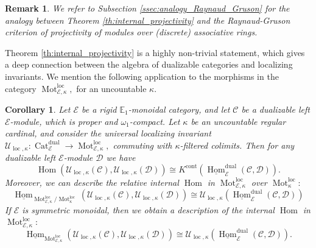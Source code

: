 \documentclass[11pt,leqno]{amsart}
\newtheorem{cor}[theo]{Corollary}
\newtheorem{remark}[theo]{Remark}
\numberwithin{equation}{section}
\def\Hom{\operatorname{Hom}}
\newcommand{\tens}[1]{%
  \mathbin{\mathop{\otimes}\displaylimits_{#1}}%
}
\newcommand{\Mot}{\operatorname{Mot}}
\newcommand{\Cat}{\operatorname{Cat}}
\newcommand{\loc}{\operatorname{loc}}
\newcommand{\cont}{\operatorname{cont}}
\newcommand{\dual}{\operatorname{dual}}
\newcommand{\bE}{{\mathbb E}}
\newcommand{\cD}{{\mathcal D}}
\newcommand{\cC}{{\mathcal C}}
\newcommand{\cE}{{\mathcal E}}
\newcommand{\cU}{{\mathcal U}}
\newcommand{\un}{\underline}
\begin{document}
\begin{remark}We refer to Subsection \ref{ssec:analogy_Raynaud_Gruson} for the analogy between Theorem \ref{th:internal_projectivity} and the Raynaud-Gruson criterion of projectivity of modules over (discrete) associative rings. 
\end{remark}

Theorem \ref{th:internal_projectivity} is a highly non-trivial statement, which gives a deep connection between the algebra of dualizable categories and localizing invariants. We mention the following application to the morphisms in the category $\Mot_{\cE,\kappa}^{\loc},$ for an uncountable $\kappa.$

\begin{cor}\label{cor:internal_Hom_in_Mot^loc_kappa}
Let $\cE$ be a rigid $\bE_1$-monoidal category, and let $\cC$ be a dualizable left $\cE$-module, which is proper and $\omega_1$-compact. Let $\kappa$ be an uncountable regular cardinal, and consider the universal localizing invariant $\cU_{\loc,\kappa}:\Cat_{\cE}^{\dual}\to\Mot^{\loc}_{\cE,\kappa},$ commuting with $\kappa$-filtered colimits. Then for any dualizable left $\cE$-module $\cD$ we have
\begin{equation}\label{eq:morphisms_in_Mot^loc_kappa}
\Hom(\cU_{\loc,\kappa}(\cC),\cU_{\loc,\kappa}(\cD))\cong K^{\cont}(\un{\Hom}_{\cE}^{\dual}(\cC,\cD)).
\end{equation}
Moreover, we can describe the relative internal $\Hom$ in $\Mot^{\loc}_{\cE,\kappa}$ over $\Mot^{\loc}_{\kappa}:$
\begin{equation}\label{eq:rel_internal_Hom_in_Mot^loc_kappa}
\un{\Hom}_{\Mot^{\loc}_{\cE,\kappa}/\Mot^{\loc}_{\kappa}}(\cU_{\loc,\kappa}(\cC),\cU_{\loc,\kappa}(\cD))\cong \cU_{\loc,\kappa}(\un{\Hom}_{\cE}^{\dual}(\cC,\cD))
\end{equation}
If $\cE$ is symmetric monoidal, then we obtain a description of the internal $\Hom$ in $\Mot^{\loc}_{\cE,\kappa}:$
\begin{equation}\label{eq:internal_Hom_in_Mot^loc_kappa}
\un{\Hom}_{\Mot^{\loc}_{\cE,\kappa}}(\cU_{\loc,\kappa}(\cC),\cU_{\loc,\kappa}(\cD))\cong \cU_{\loc,\kappa}(\un{\Hom}_{\cE}^{\dual}(\cC,\cD)).
\end{equation}
\end{cor}
\end{document}
